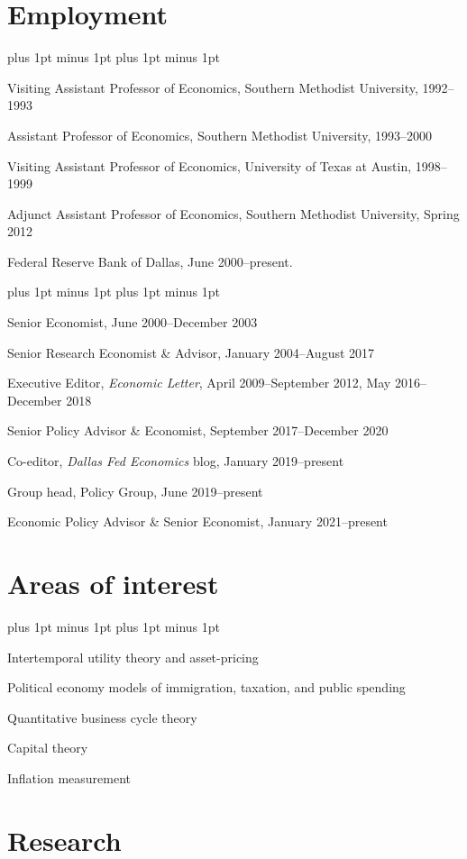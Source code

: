 \documentclass[letterpaper]{article}
\renewenvironment{itemize}{
  \begin{list}{}{
    \setlength{\leftmargin}{1.5em}
    \itemsep -1pt plus 1pt minus 1pt
    \topsep -1pt plus 1pt minus 1pt
  }
}{
  \end{list}
}
\begin{document}
\section*{Employment}
\begin{itemize}
\item Visiting Assistant Professor of Economics, Southern Methodist University, 1992--1993
\item Assistant Professor of Economics, Southern Methodist University, 1993--2000
\item Visiting Assistant Professor of Economics, University of Texas at Austin, 1998--1999
\item Adjunct Assistant Professor of Economics, Southern Methodist University, Spring 2012
\item Federal Reserve Bank of Dallas, June 2000--present.
	\begin{itemize}
	\item Senior Economist, June 2000--December 2003
	\item Senior Research Economist \& Advisor, January 2004--August 2017
	\item Executive Editor, \emph{Economic Letter}, April 2009--September 2012, May 2016--December 2018
	\item Senior Policy Advisor \& Economist, September 2017--December 2020
	\item Co-editor, \emph{Dallas Fed Economics} blog, January 2019--present
	\item Group head, Policy Group, June 2019--present
	\item Economic Policy Advisor \& Senior Economist, January 2021--present
	\end{itemize}
\end{itemize}

\section*{Areas of interest}
\begin{itemize}
\item Intertemporal utility theory and asset-pricing
\item Political economy models of immigration, taxation, and public spending
\item Quantitative business cycle theory
\item Capital theory
\item Inflation measurement
\end{itemize}

\section*{Research}
\end{document}
